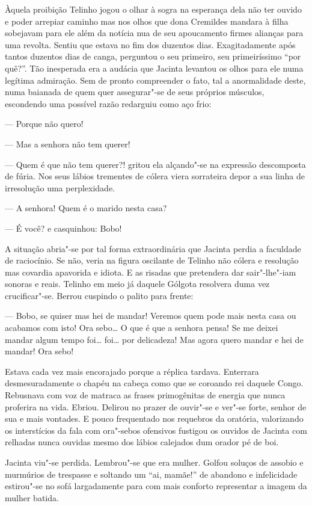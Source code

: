 Àquela proibição Telinho jogou o olhar à sogra na esperança dela não ter
ouvido e poder arrepiar caminho mas nos olhos que dona Cremildes mandara
à filha sobejavam para ele além da notícia nua de seu apoucamento firmes
alianças para uma revolta. Sentiu que estava no fim dos duzentos dias.
Exagitadamente após tantos duzentos dias de canga, perguntou o seu
primeiro, seu primeiríssimo ``por quê?''. Tão inesperada era a audácia
que Jacinta levantou os olhos para ele numa legítima admiração. Sem de
pronto compreender o fato, tal a anormalidade deste, numa baianada de
quem quer assegurar"-se de seus próprios músculos, escondendo uma
possível razão redarguiu como aço frio:

--- Porque não quero!

--- Mas a senhora não tem querer!

--- Quem é que não tem querer?! gritou ela alçando"-se na expressão
descomposta de fúria. Nos seus lábios trementes de cólera viera
sorrateira depor a sua linha de irresolução uma perplexidade.

--- A senhora! Quem é o marido nesta casa?

--- É você? e casquinhou: Bobo!

A situação abria"-se por tal forma extraordinária que Jacinta perdia a
faculdade de raciocínio. Se não, veria na figura oscilante de Telinho
não cólera e resolução mas covardia apavorida e idiota. E as risadas que
pretendera dar sair"-lhe"-iam sonoras e reais. Telinho em meio já daquele
Gólgota resolvera duma vez crucificar"-se. Berrou cuspindo o palito para
frente:

--- Bobo, se quiser mas hei de mandar! Veremos quem pode mais nesta casa
ou acabamos com isto! Ora sebo\ldots{} O que é que a senhora pensa! Se me
deixei mandar algum tempo foi\ldots{} foi\ldots{} por delicadeza! Mas agora quero
mandar e hei de mandar! Ora sebo!

Estava cada vez mais encorajado porque a réplica tardava. Enterrara
desmesuradamente o chapéu na cabeça como que se coroando rei daquele
Congo. Rebusnava com voz de matraca as frases primogênitas de energia
que nunca proferira na vida. Ebriou. Delirou no prazer de ouvir"-se e
ver"-se forte, senhor de sua e mais vontades. E pouco frequentado nos
requebros da oratória, valorizando os interstícios da fala com ora"-sebos
ofensivos fustigou os ouvidos de Jacinta com relhadas nunca ouvidas
mesmo dos lábios calejados dum orador pé de boi.

Jacinta viu"-se perdida. Lembrou"-se que era mulher. Golfou soluços de
assobio e murmúrios de trespasse e soltando um ``ai, mamãe!'' de
abandono e infelicidade estirou"-se no sofá largadamente para com mais
conforto representar a imagem da mulher batida.

